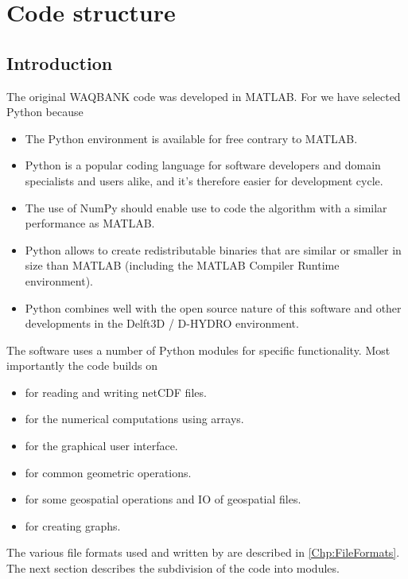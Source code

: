 \chapter{Code structure}

\section{Introduction}

The original WAQBANK code was developed in MATLAB.
For \dfastbe we have selected Python because

\begin{itemize}
\item The Python environment is available for free contrary to MATLAB.
\item Python is a popular coding language for software developers and domain specialists and users alike, and it's therefore easier for development cycle.
\item The use of NumPy should enable use to code the algorithm with a similar performance as MATLAB.
\item Python allows to create redistributable binaries that are similar or smaller in size than MATLAB (including the MATLAB Compiler Runtime environment).
\item Python combines well with the open source nature of this software and other developments in the Delft3D / D-HYDRO environment.
\end{itemize}

The software uses a number of Python modules for specific functionality.
Most importantly the code builds on

\begin{itemize}
\item {} for reading and writing netCDF files.
\item {} for the numerical computations using arrays.
\item {} for the graphical user interface.
\item {} for common geometric operations.
\item {} for some geospatial operations and IO of geospatial files.
\item {} for creating graphs.
\end{itemize}

The various file formats used and written by \dfastbe are described in \autoref{Chp:FileFormats}.
The next section describes the subdivision of the code into modules.


